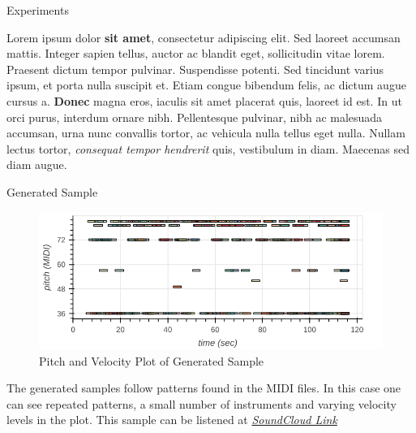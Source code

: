\documentclass[final]{beamer}
\newlength{\onecolwid}
\newlength{\twocolwid}
\begin{document}
\begin{frame}[t]
\begin{columns}[t]
\begin{column}{\twocolwid}
\begin{columns}[t,totalwidth=\twocolwid]
\begin{column}{\onecolwid}

\begin{block}{Experiments}

Lorem ipsum dolor \textbf{sit amet}, consectetur adipiscing elit. Sed laoreet accumsan mattis. Integer sapien tellus, auctor ac blandit eget, sollicitudin vitae lorem. Praesent dictum tempor pulvinar. Suspendisse potenti. Sed tincidunt varius ipsum, et porta nulla suscipit et. Etiam congue bibendum felis, ac dictum augue cursus a. \textbf{Donec} magna eros, iaculis sit amet placerat quis, laoreet id est. In ut orci purus, interdum ornare nibh. Pellentesque pulvinar, nibh ac malesuada accumsan, urna nunc convallis tortor, ac vehicula nulla tellus eget nulla. Nullam lectus tortor, \textit{consequat tempor hendrerit} quis, vestibulum in diam. Maecenas sed diam augue.

\end{block}



\begin{alertblock}{Generated Sample}


\begin{figure}
\includegraphics[width=0.5\linewidth]{winter_planet_midi_plot.png}
\caption{Pitch and Velocity Plot of Generated Sample}
\end{figure}

The generated samples follow patterns found in the MIDI files. In this case one can see repeated patterns, a small number of instruments and varying velocity levels in the plot. This sample can be listened at \href{https://soundcloud.com/saravana-r-389436812/cs236-multi-instrument-music-generation-using-vae?si=53eaea6cb734413d80f88bcabc25d3c4}{\textit{SoundCloud Link}}

\end{alertblock} 

\end{column} %


\end{columns}
\end{column}
\end{columns}
\end{frame}
\end{document}
